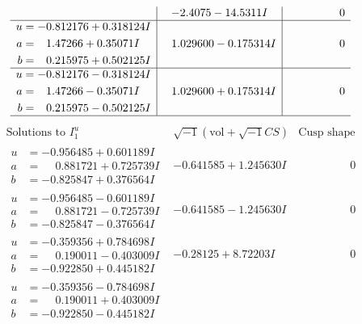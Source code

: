 \documentclass[1p]{elsarticle_modified}
\theoremstyle{definition}
\newcommand{\I}{\sqrt{-1}}
\begin{document}
$$\begin{array}{c|c|c}
 & -2.4075 - 14.5311 I & \phantom{-0.000000 } 0 \\ \hline\begin{aligned}
u &= -0.812176 + 0.318124 I \\
a &= \phantom{-}1.47266 + 0.35071 I \\
b &= \phantom{-}0.215975 + 0.502125 I\end{aligned}
 & \phantom{-}1.029600 - 0.175314 I & \phantom{-0.000000 } 0 \\ \hline\begin{aligned}
u &= -0.812176 - 0.318124 I \\
a &= \phantom{-}1.47266 - 0.35071 I \\
b &= \phantom{-}0.215975 - 0.502125 I\end{aligned}
 & \phantom{-}1.029600 + 0.175314 I & \phantom{-0.000000 } 0\\
 \hline 
 \end{array}$$\newpage$$\begin{array}{c|c|c}  
\text{Solutions to }I^u_{1}& \I (\text{vol} + \sqrt{-1}CS) & \text{Cusp shape}\\
 \hline 
\begin{aligned}
u &= -0.956485 + 0.601189 I \\
a &= \phantom{-}0.881721 + 0.725739 I \\
b &= -0.825847 + 0.376564 I\end{aligned}
 & -0.641585 + 1.245630 I & \phantom{-0.000000 } 0 \\ \hline\begin{aligned}
u &= -0.956485 - 0.601189 I \\
a &= \phantom{-}0.881721 - 0.725739 I \\
b &= -0.825847 - 0.376564 I\end{aligned}
 & -0.641585 - 1.245630 I & \phantom{-0.000000 } 0 \\ \hline\begin{aligned}
u &= -0.359356 + 0.784698 I \\
a &= \phantom{-}0.190011 - 0.403009 I \\
b &= -0.922850 + 0.445182 I\end{aligned}
 & -0.28125 + 8.72203 I & \phantom{-0.000000 } 0 \\ \hline\begin{aligned}
u &= -0.359356 - 0.784698 I \\
a &= \phantom{-}0.190011 + 0.403009 I \\
b &= -0.922850 - 0.445182 I\end{aligned}

\end{array}$$
\end{document}
